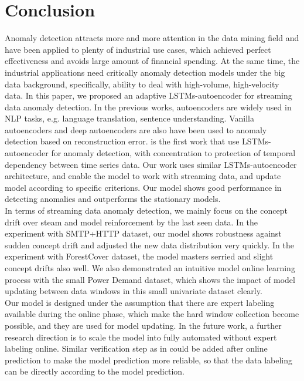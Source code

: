 \chapter{Conclusion}
\label{chap:conclusion}



Anomaly detection attracts more and more attention in the data mining field and have been applied to plenty of industrial use cases, which achieved perfect effectiveness and avoids large amount of financial spending. At the same time, the industrial applications need critically anomaly detection models under the big data background, specifically, ability to deal with high-volume, high-velocity data. In this paper, we proposed an adaptive LSTMs-autoencoder for streaming data anomaly detection. In the previous works, autoencoders are widely used in NLP tasks, e.g. language translation, sentence understanding. Vanilla autoencoders and deep autoencoders are also have been used to anomaly detection based on reconstruction error. \cite{encdecad} is the first work that use LSTMs-autoencoder for anomaly detection, with concentration to protection of temporal dependency between time series data. Our work uses similar LSTMs-autoencoder architecture, and enable the model to work with streaming data, and update model according to specific criterions. Our model shows good performance in detecting anomalies and outperforms the stationary models.\\

In terms of streaming data anomaly detection, we mainly focus on the concept drift over steam and model reinforcement by the last seen data. In the experiment with SMTP+HTTP dataset, our model shows robustness against sudden concept drift and adjusted the new data distribution very quickly. In the experiment with ForestCover dataset, the model masters serried and slight concept drifts also well. We also demonstrated an intuitive model online learning process with the small Power Demand dataset, which shows the impact of model updating between data windows in this small univariate dataset clearly.\\

Our model is designed under the assumption that there are expert labeling available during the online phase, which make the hard window collection become possible, and they are used for model updating. In the future work, a further research direction is to scale the model into fully automated without expert labeling online. Similar verification step as in \cite{threaded} could be added after online prediction to make the model prediction more reliable, so that the data labeling can be directly according to the model prediction.\\